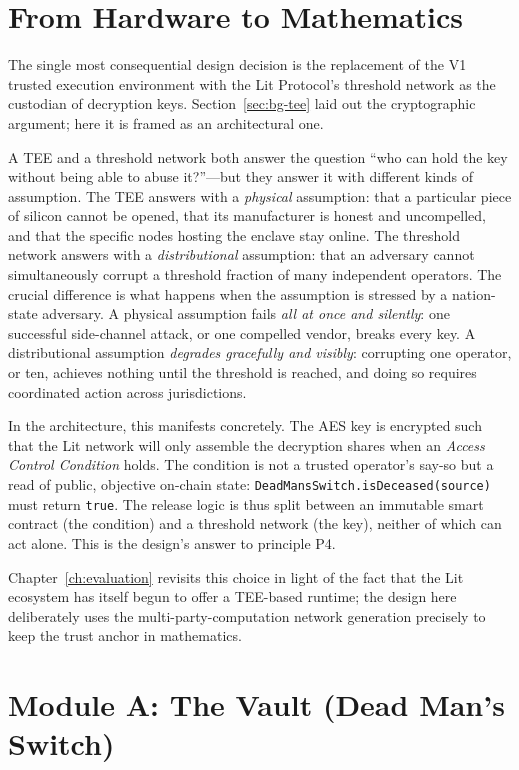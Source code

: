 \section{From Hardware to Mathematics}
\label{sec:design-shift}

The single most consequential design decision is the replacement of the V1
trusted execution environment with the Lit Protocol's threshold network as the
custodian of decryption keys. Section~\ref{sec:bg-tee} laid out the cryptographic
argument; here it is framed as an architectural one.

A TEE and a threshold network both answer the question ``who can hold the key
without being able to abuse it?''---but they answer it with different kinds of
assumption. The TEE answers with a \emph{physical} assumption: that a particular
piece of silicon cannot be opened, that its manufacturer is honest and
uncompelled, and that the specific nodes hosting the enclave stay online. The
threshold network answers with a \emph{distributional} assumption: that an
adversary cannot simultaneously corrupt a threshold fraction of many independent
operators. The crucial difference is what happens when the assumption is stressed
by a nation-state adversary. A physical assumption fails \emph{all at once and
silently}: one successful side-channel attack, or one compelled vendor, breaks
every key. A distributional assumption \emph{degrades gracefully and visibly}:
corrupting one operator, or ten, achieves nothing until the threshold is reached,
and doing so requires coordinated action across jurisdictions.

In the architecture, this manifests concretely. The AES key is encrypted such
that the Lit network will only assemble the decryption shares when an
\emph{Access Control Condition} holds. The condition is not a trusted operator's
say-so but a read of public, objective on-chain state:
\texttt{DeadMansSwitch.isDeceased(source)} must return \texttt{true}. The release
logic is thus split between an immutable smart contract (the condition) and a
threshold network (the key), neither of which can act alone. This is the design's
answer to principle P4.

Chapter~\ref{ch:evaluation} revisits this choice in light of the fact that the
Lit ecosystem has itself begun to offer a TEE-based runtime; the design here
deliberately uses the multi-party-computation network generation precisely to
keep the trust anchor in mathematics.

\section{Module A: The Vault (Dead Man's Switch)}
\label{sec:design-vault}

